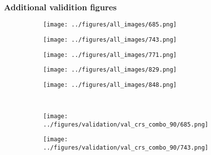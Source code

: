 \subsubsection{Additional validition figures}
\begin{figure}[h!]
	\begin{subfigure}[b]{0.03\textwidth} %
		\centering
	\end{subfigure}
	\hspace{0.05cm}
	\begin{subfigure}{0.18\textwidth}
		\centering
		\texttt{[image: ../figures/all\_images/685.png]}
		\label{fig:1}
	\end{subfigure}
	\begin{subfigure}{0.18\textwidth}
		\centering
		\texttt{[image: ../figures/all\_images/743.png]}
		\label{fig:1}
	\end{subfigure}
	\begin{subfigure}{0.18\textwidth}
		\centering
		\texttt{[image: ../figures/all\_images/771.png]}
		\label{fig:1}
	\end{subfigure}
	\begin{subfigure}{0.18\textwidth}
		\centering
		\texttt{[image: ../figures/all\_images/829.png]}
		\label{fig:1}
	\end{subfigure}
	\begin{subfigure}{0.18\textwidth}
		\centering
		\texttt{[image: ../figures/all\_images/848.png]}
		\label{fig:1}
	\end{subfigure}
	\vspace{-0.35cm}
	\\
	\begin{subfigure}[b]{0.03\textwidth} %
	\centering
\end{subfigure}
\hspace{0.05cm}
	\begin{subfigure}{0.18\textwidth}
		\centering
		\texttt{[image: ../figures/validation/val\_crs\_combo\_90/685.png]}
		\label{fig:1}
	\end{subfigure}
	\begin{subfigure}{0.18\textwidth}
		\centering
		\texttt{[image: ../figures/validation/val\_crs\_combo\_90/743.png]}
		\label{fig:1}
	\end{subfigure}

\end{figure}
